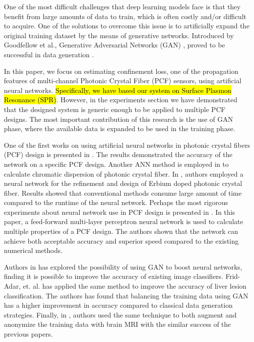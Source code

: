 \documentclass[10pt]{IEEEtran}
\begin{document}
One of the most difficult challenges that deep learning models face is that they benefit from large amounts of data to train, which is often costly and/or difficult to acquire. One of the solutions to overcome this issue is to artificially expand the original training dataset by the means of generative networks. Introduced by Goodfellow et al., Generative Adversarial Networks (GAN) \cite{goodfellow2014generative}, proved to be successful in data generation \cite{schlegl2017unsupervised, zheng2017unlabeled, frid2018synthetic, tanaka2019data, perez2017effectiveness}.

In this paper, we focus on estimating confinement loss, one of the propagation features of multi-channel Photonic Crystal Fiber (PCF) sensors, using artificial neural networks. \hl{Specifically, we have based our system on Surface Plasmon Resonance (SPR)}. However, in the experiments section we have demonstrated that the designed system is generic enough to be applied to multiple PCF designs. The most important contribution of this research is the use of GAN phase, where the available data is expanded to be used in the training phase.

One of the first works on using artificial neural networks in photonic crystal fibers (PCF) design is presented in \cite{hameed2008accurate}. The results demonstrated the accuracy of the network on a specific PCF design. Another ANN method is employed in \cite{rodriguez2010efficient} to calculate chromatic dispersion of photonic crystal fiber. In \cite{mescia2011refinement}, authors employed a neural network for the refinement and design of Erbium doped photonic crystal fiber. Results showed that conventional methods consume large amount of time compared to the runtime of the neural network. Perhaps the most rigorous experiments about neural network use in PCF design is presented in \cite{paper0}. In this paper, a feed-forward multi-layer perceptron neural network is used to calculate multiple properties of a PCF design. The authors shown that the network can achieve both acceptable accuracy and superior speed compared to the existing numerical methods.

Authors in \cite{perez2017effectiveness} has explored the possibility of using GAN to boost neural networks, finding it is possible to improve the accuracy of existing image classifiers. Frid-Adar, et. al. \cite{frid2018synthetic} has applied the same method to improve the accuracy of liver lesion classification. The authors has found that balancing the training data using GAN has a higher improvement in accuracy compared to classical data generation strategies. Finally, in \cite{shin2018medical}, authors used the same technique to both augment and anonymize the training data with brain MRI with the similar success of the previous papers.
\end{document}
